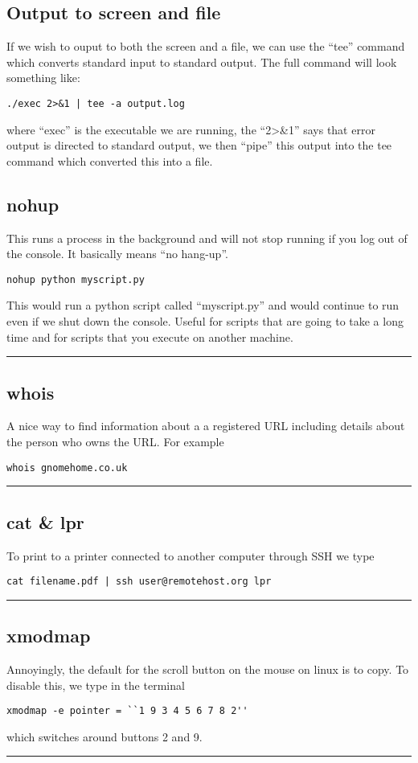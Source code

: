 \documentclass[a4paper, 10pt]{article}
\newcommand{\mybotrule}{\vspace{4mm}\hrule}
\begin{document}
\subsection*{Output to screen and file}
\label{sec:output-screen-file}

If we wish to ouput to both the screen and a file, we can use the
``tee'' command which converts standard input to standard output. The
full command will look something like:
\begin{verbatim}
./exec 2>&1 | tee -a output.log
\end{verbatim}
where ``exec'' is the executable we are running, the ``2>\&1'' says
that error output is directed to standard output, we then ``pipe''
this output into the tee command which converted this into a file. 

\subsection*{nohup}
This runs a process in the background and will not stop running if you log out of the console. It basically means ``no hang-up''.
\begin{verbatim}
nohup python myscript.py
\end{verbatim}
This would run a python script called ``myscript.py'' and would continue to run even if we shut down the console. Useful for scripts that are going to take a long time and for scripts that you execute on another machine.
\mybotrule

\subsection*{whois}
A nice way to find information about a a registered URL including details about the person who owns the URL. For example
\begin{verbatim}
whois gnomehome.co.uk
\end{verbatim}
\mybotrule

\subsection*{cat \& lpr}
To print to a printer connected to another computer through SSH we type 
\begin{verbatim}
cat filename.pdf | ssh user@remotehost.org lpr
\end{verbatim}
\mybotrule

\subsection*{xmodmap}
Annoyingly, the default for the scroll button on the mouse on linux is to copy. To disable this, we type in the terminal
\begin{verbatim}
xmodmap -e pointer = ``1 9 3 4 5 6 7 8 2''
\end{verbatim}
which switches around buttons 2 and 9.
\mybotrule
\end{document}
